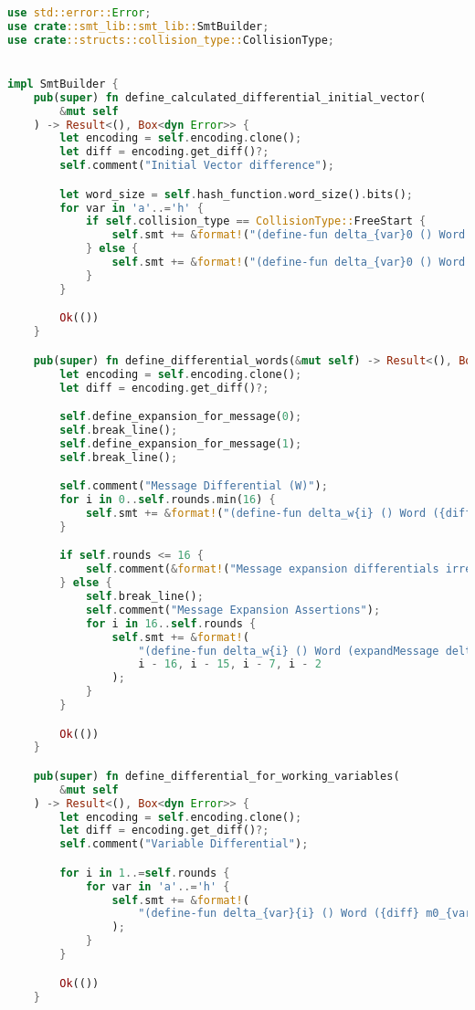 \begin{lstlisting}[language=rust, caption={smt\_lib/encodings/differential\_shared.rs}]
use std::error::Error;
use crate::smt_lib::smt_lib::SmtBuilder;
use crate::structs::collision_type::CollisionType;


impl SmtBuilder {
	pub(super) fn define_calculated_differential_initial_vector(
		&mut self
	) -> Result<(), Box<dyn Error>> {
		let encoding = self.encoding.clone();
		let diff = encoding.get_diff()?;
		self.comment("Initial Vector difference");

		let word_size = self.hash_function.word_size().bits();
		for var in 'a'..='h' {
			if self.collision_type == CollisionType::FreeStart {
				self.smt += &format!("(define-fun delta_{var}0 () Word ({diff} m0_{var}0 m1_{var}0))\n");
			} else {
				self.smt += &format!("(define-fun delta_{var}0 () Word #b{})\n", "0".repeat(word_size));
			}
		}

		Ok(())
	}

	pub(super) fn define_differential_words(&mut self) -> Result<(), Box<dyn Error>> {
		let encoding = self.encoding.clone();
		let diff = encoding.get_diff()?;

		self.define_expansion_for_message(0);
		self.break_line();
		self.define_expansion_for_message(1);
		self.break_line();

		self.comment("Message Differential (W)");
		for i in 0..self.rounds.min(16) {
			self.smt += &format!("(define-fun delta_w{i} () Word ({diff} m0_w{i} m1_w{i}))\n");
		}

		if self.rounds <= 16 {
			self.comment(&format!("Message expansion differentials irrelevant for {} rounds", self.rounds));
		} else {
			self.break_line();
			self.comment("Message Expansion Assertions");
			for i in 16..self.rounds {
				self.smt += &format!(
					"(define-fun delta_w{i} () Word (expandMessage delta_w{} delta_w{} delta_w{} delta_w{}))",
					i - 16, i - 15, i - 7, i - 2
				);
			}
		}

		Ok(())
	}

	pub(super) fn define_differential_for_working_variables(
		&mut self
	) -> Result<(), Box<dyn Error>> {
		let encoding = self.encoding.clone();
		let diff = encoding.get_diff()?;
		self.comment("Variable Differential");

		for i in 1..=self.rounds {
			for var in 'a'..='h' {
				self.smt += &format!(
					"(define-fun delta_{var}{i} () Word ({diff} m0_{var}{i} m1_{var}{i}))\n"
				);
			}
		}

		Ok(())
	}


\end{lstlisting}
